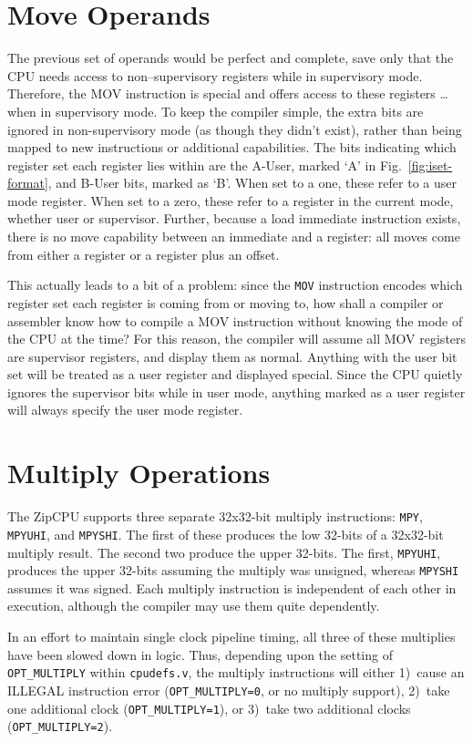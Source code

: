 \documentclass{gqtekspec}
\begin{document}
\section{Move Operands}
The previous set of operands would be perfect and complete, save only that
the CPU needs access to non--supervisory registers while in supervisory mode. 
Therefore, the MOV instruction is special and offers access to these registers
\ldots when in supervisory mode.  To keep the compiler simple, the extra bits
are ignored in non-supervisory mode (as though they didn't exist), rather than
being mapped to new instructions or additional capabilities.  The bits
indicating which register set each register lies within are the A-User, marked
`A' in Fig.~\ref{fig:iset-format}, and B-User bits, marked as `B'.  When set
to a one, these refer to a user mode register.  When set to a zero, these
refer to a register in the current mode, whether user or supervisor.  Further,
because a load immediate instruction exists, there is no move capability
between an immediate and a register: all moves come from either a register or
a register plus an offset.

This actually leads to a bit of a problem: since the {\tt MOV} instruction
encodes which register set each register is coming from or moving to, how shall
a compiler or assembler know how to compile a MOV instruction without knowing
the mode of the CPU at the time?  For this reason, the compiler will assume
all MOV registers are supervisor registers, and display them as normal. 
Anything with the user bit set will be treated as a user register and displayed
special.  Since the CPU quietly ignores the supervisor bits while in user mode,
anything marked as a user register will always specify the user mode register.

\section{Multiply Operations}

The ZipCPU supports three separate 32x32-bit multiply
instructions: {\tt MPY}, {\tt MPYUHI}, and {\tt MPYSHI}.  The first of these
produces the low 32-bits of a 32x32-bit multiply result.  The second two
produce the upper 32-bits.  The first, {\tt MPYUHI}, produces the upper 32-bits
assuming the multiply was unsigned, whereas {\tt MPYSHI} assumes it was signed.
Each multiply instruction is independent of each other in execution, although
the compiler may use them quite dependently.

In an effort to maintain single clock pipeline timing, all three of these
multiplies have been slowed down in logic.  Thus, depending upon the setting
of {\tt OPT\_MULTIPLY} within {\tt cpudefs.v}, the multiply instructions
will either 1)~cause an ILLEGAL instruction error ({\tt OPT\_MULTIPLY=0}, or
no multiply support), 2)~take one additional clock ({\tt OPT\_MULTIPLY=1}),
or 3)~take two additional clocks ({\tt OPT\_MULTIPLY=2}). 
\end{document}
